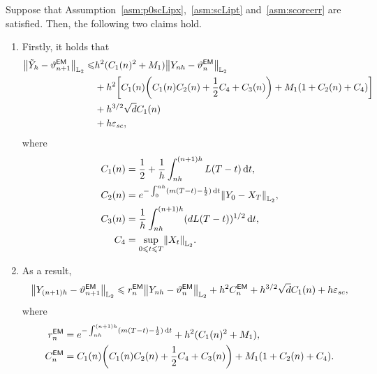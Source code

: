 \begin{proposition}
    \label{prop:EM}
    Suppose that Assumption~\ref{asm:p0scLipx},~\ref{asm:scLipt} and~\ref{asm:scoreerr} are satisfied. 
    Then, the following two claims hold.
    \begin{enumerate}[label=\textbf{(\arabic*)}, leftmargin=2em]
        \item \label{item:EMtilde} Firstly, it holds that
        \begin{align*}
            \l|\tilde{Y}_h-\vartheta_{n+1}^{\sf EM}\r|_{\Ltwo}\leqslant& h^2(C_1(n)^2+M_1)\l|Y_{nh}-\vartheta_n^{\sf EM}\r|_{\Ltwo}\\
            &+h^2\left[C_1(n)\left(C_1(n)C_2(n)+\dfrac{1}{2}C_4+C_3(n)\right)+M_1\left(1+C_2(n)+C_4\right)\right]\\
            &+h^{3/2}\sqrt{d}C_1(n)\\
            &+h\varepsilon_{sc},
        \end{align*}
        where
        \begin{align*}
            C_1(n)&=\dfrac{1}{2}+\dfrac{1}{h}\int_{nh}^{(n+1)h}L(T-t)\rmd t,\\
            C_2(n)&=e^{-\int_0^{nh}(m(T-t)-\frac{1}{2})\rmd t}\l|Y_0-X_T\r|_{\Ltwo},\\
            C_3(n)&=\dfrac{1}{h}\int_{nh}^{(n+1)h}(dL(T-t))^{1/2}\rmd t,\\
            C_4&=\sup_{0\leqslant t\leqslant T}\l|X_t\r|_{\Ltwo}.
        \end{align*}
        \item \label{item:EMYt}
        As a result, 
        \begin{align*}
            \l|Y_{(n+1)h}-\vartheta_{n+1}^{\sf EM}\r|_{\Ltwo}\leqslant r_n^{\sf EM}\l|Y_{nh}-\vartheta_n^{\sf EM}\r|_{\Ltwo}+h^2C_n^{\sf EM}+h^{3/2}\sqrt{d}C_1(n)+h\varepsilon_{sc},
        \end{align*}
        where
        \begin{align*}
            r_n^{\sf EM}&=e^{-\int_{nh}^{(n+1)h}(m(T-t)-\frac{1}{2})\rmd t}+h^2(C_1(n)^2+M_1),\\
            C_n^{\sf EM}&=C_1(n)\left(C_1(n)C_2(n)+\dfrac{1}{2}C_4+C_3(n)\right)+M_1\left(1+C_2(n)+C_4\right).
        \end{align*}
    \end{enumerate}
\end{proposition}
